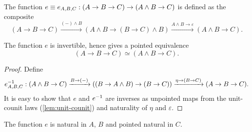 \documentclass{article}
\newcommand{\pmap}{\to}
\newcommand{\lpmap}{\xrightarrow}
\newcommand{\smsh}{\wedge}
\renewcommand{\epsilon}{\varepsilon}
\renewcommand{\o}{\ensuremath{\circ}}
\begin{document}
\begin{defn}
The function $e\jdeq e_{A,B,C}:(A\pmap B\pmap C)\pmap(A\smsh B\pmap C)$ is defined as the composite
$$(A\pmap B\pmap C)\lpmap{({-})\smsh B}(A\smsh B\pmap (B\pmap C)\smsh B)\lpmap{A\smsh B \pmap\epsilon}(A\smsh B\pmap C).$$
\end{defn}

\begin{lem}
  The function $e$ is invertible, hence gives a pointed equivalence $$(A\pmap B\pmap C)\simeq(A\smsh B\pmap C).$$
\end{lem}
\begin{proof}
  Define
  $$\inv{e}_{A,B,C}:(A\smsh B\pmap C)\lpmap{B\pmap({-})}((B\pmap A\smsh B)\pmap (B\pmap
  C))\lpmap{\eta\pmap(B\pmap C)}(A\pmap B\pmap C).$$ It is easy to show that $e$ and ${e}^{-1}$ are
  inverses as unpointed maps from the unit-counit laws (\autoref{lem:unit-counit}) and naturality of $\eta$ and $\epsilon$.
\end{proof}
\begin{lem}\label{lem:e-natural}
	The function $e$ is natural in $A$, $B$ and pointed natural in $C$.
\end{lem}
\end{document}
